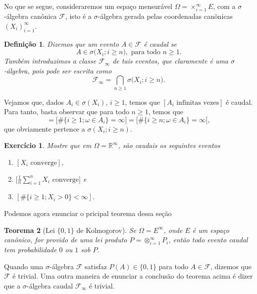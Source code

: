 \documentclass[reqno]{article}
\newcommand*\1{\mathds{1}}
\newtheorem{theorem}{Teorema}[section]
\newtheorem{definition}[theorem]{Definição}
\newtheorem{exercise}[example]{Exercício}
\newcommand{\mcap}{\textstyle \bigcap\limits}
\begin{document}
No que se segue, consideraremos um espaço mensurável $\Omega = \times_{i=1}^\infty E$, com a $\sigma$-álgebra canônica $\mathcal{F}$, isto é a $\sigma$-álgebra gerada pelas coordenadas canõnicas $(X_i)_{i=1}^\infty$.
\begin{definition}
  Dizemos que um evento $A \in \mathcal{F}$ é caudal se
  \begin{equation}
    A \in \sigma\big( X_i; i \geq n\big), \text{ para todo $n \geq 1$}.
  \end{equation}
  Também introduzimos a classe $\mathcal{F}_\infty$ de tais eventos, que claramente é uma $\sigma$-álgebra, pois pode ser escrita como
  \begin{equation}
    \mathcal{F}_\infty = \mcap_{n \geq 1} \sigma\big( X_i; i \geq n\big).
  \end{equation}
\end{definition}

Vejamos que, dados $A_i \in \sigma(X_i)$, $i \geq 1$, temos que $[A_i \text{ infinitas vezes}]$ é caudal.
Para tanto, basta observar que para todo $n \geq 1$, temos que
\begin{equation*}
  [A_i \text{ infinitas vezes}] = \big[\#\{i \geq 1; \omega \in A_i\} = \infty\big] = \big[\#\{i \geq n; \omega \in A_i\} = \infty\big],
\end{equation*}
que obviamente pertence a $\sigma(X_i; i \geq n)$.

\begin{exercise}
  Mostre que em $\Omega = \mathbb{R}^{\infty}$, são caudais os seguintes eventos
  \begin{enumerate}
  \item $[X_i \text{ converge}]$,
  \item $\big[\tfrac{1}{n} \sum_{i=1}^n X_i \text{ converge}\big]$ e
  \item $[\#\{i \geq 1; X_i > 0\} < \infty]$.
  \end{enumerate}
\end{exercise}

Podemos agora enunciar o pricipal teorema dessa seção

\begin{theorem}[Lei $\{0,1\}$ de Kolmogorov]
  Se $\Omega = E^{\infty}$, onde $E$ é um espaço canônico, for provido de uma lei produto $P = \otimes_{i=1}^\infty P_i$, então todo evento caudal tem probabilidade $0$ ou $1$ sob $P$.
\end{theorem}

Quando uma $\sigma$-álgebra $\mathcal{F}$ satisfaz $P(A) \in \{0,1\}$ para todo $A \in \mathcal{F}$, dizemos que $\mathcal{F}$ é trivial.
Uma outra maneira de enunciar a conclusão do teorema acima é dizer que a $\sigma$-álgebra caudal $\mathcal{F}_\infty$ é trivial.
\end{document}
